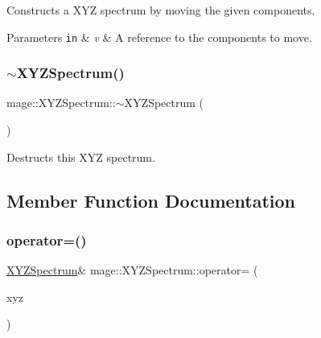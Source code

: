 Constructs a X\+YZ spectrum by moving the given components.


\begin{DoxyParams}[1]{Parameters}
\mbox{\tt in}  & {\em v} & A reference to the components to move. \\
\hline
\end{DoxyParams}
\hypertarget{structmage_1_1_x_y_z_spectrum_af3a318ebdb1eb1e47cd81707850049a7}{}\label{structmage_1_1_x_y_z_spectrum_af3a318ebdb1eb1e47cd81707850049a7} 
\subsubsection{\texorpdfstring{$\sim$\+X\+Y\+Z\+Spectrum()}{~XYZSpectrum()}}
{\footnotesize\ttfamily mage\+::\+X\+Y\+Z\+Spectrum\+::$\sim$\+X\+Y\+Z\+Spectrum (\begin{DoxyParamCaption}{ }\end{DoxyParamCaption})\hspace{0.3cm}{\ttfamily [default]}}

Destructs this X\+YZ spectrum. 

\subsection{Member Function Documentation}
\hypertarget{structmage_1_1_x_y_z_spectrum_afb9ded2a6c69514b9853f753c5f94f98}{}\label{structmage_1_1_x_y_z_spectrum_afb9ded2a6c69514b9853f753c5f94f98} 
\subsubsection{\texorpdfstring{operator=()}{operator=()}\hspace{0.1cm}{\footnotesize\ttfamily [1/2]}}
{\footnotesize\ttfamily \hyperlink{structmage_1_1_x_y_z_spectrum}{X\+Y\+Z\+Spectrum}\& mage\+::\+X\+Y\+Z\+Spectrum\+::operator= (\begin{DoxyParamCaption}\item[{const \hyperlink{structmage_1_1_x_y_z_spectrum}{X\+Y\+Z\+Spectrum} \&}]{xyz }\end{DoxyParamCaption})\hspace{0.3cm}{\ttfamily [default]}}

